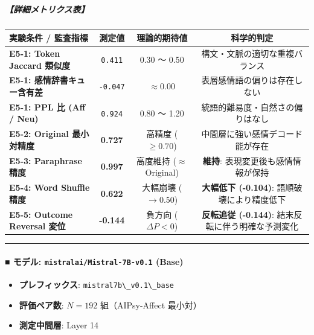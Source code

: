 \subparagraph{【詳細メトリクス表】}
\begin{center}
\small
\begin{tabular}{lccc}
\toprule
\textbf{実験条件 / 監査指標} & \textbf{測定値} & \textbf{理論的期待値} & \textbf{科学的判定} \\
\midrule
\textbf{E5-1: Token Jaccard 類似度} & \texttt{0.411} & 0.30 〜 0.50 & 構文・文脈の適切な重複バランス \\
\textbf{E5-1: 感情辞書キュー含有差} & \texttt{-0.047} & $\approx 0.00$ & 表層感情語の偏りは存在しない \\
\textbf{E5-1: PPL 比 (Aff / Neu)} & \texttt{0.924} & 0.80 〜 1.20 & 統語的難易度・自然さの偏りはなし \\
\textbf{E5-2: Original 最小対精度} & \textbf{0.727} & 高精度 ($\ge 0.70$) & 中間層に強い感情デコード能が存在 \\
\textbf{E5-3: Paraphrase 精度} & \textbf{0.997} & 高度維持 ($\approx$ Original) & \textbf{維持}: 表現変更後も感情情報が保持 \\
\textbf{E5-4: Word Shuffle 精度} & \textbf{0.622} & 大幅崩壊 ($\rightarrow 0.50$) & \textbf{大幅低下 (-0.104)}: 語順破壊により精度低下 \\
\textbf{E5-5: Outcome Reversal 変位} & \textbf{-0.144} & 負方向 ($\Delta P < 0$) & \textbf{反転追従 (-0.144)}: 結末反転に伴う明確な予測変化 \\
\bottomrule
\end{tabular}
\end{center}


\vspace{0.5em}\hrule\vspace{0.5em}

\paragraph{■ モデル: \texttt{mistralai/Mistral-7B-v0.1} (Base)}
\begin{itemize}
\item \textbf{プレフィックス}: \texttt{mistral7b\textbackslash{}\_v0.1\textbackslash{}\_base}
\item \textbf{評価ペア数}: $N=192$ 組（AIPsy-Affect 最小対）
\item \textbf{測定中間層}: Layer 14
\end{itemize}

